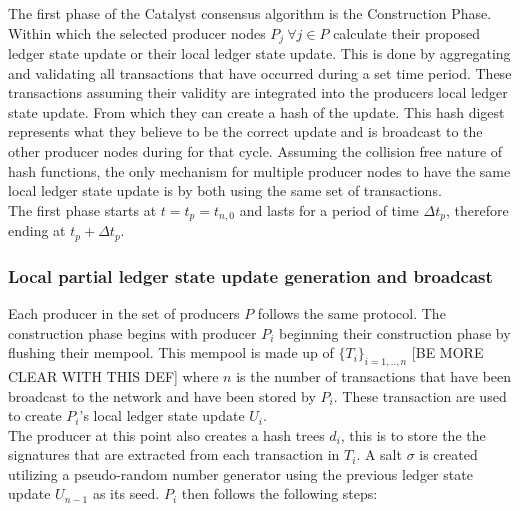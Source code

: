 \documentclass{article}
\begin{document}
The first phase of the Catalyst consensus algorithm is the Construction Phase. Within which the selected producer nodes  $P_j~\forall j \in P$ calculate their proposed ledger state update or their local ledger state update. This is done by aggregating and validating all transactions that have occurred during a set time period. These transactions assuming their validity are integrated into the producers local ledger state update. From which they can create a hash of the update. This hash digest represents what they believe to be the correct update and is broadcast to the other producer nodes during for that cycle. Assuming the collision free nature of hash functions, the only mechanism for multiple producer nodes to have the same local ledger state update is by both using the same set of transactions. \\

The first phase starts at $t = t_p = t_{n,0}$ and lasts for a period of time $\Delta t_{p}$, therefore ending at $t_p+\Delta t_{p}$.

\subsubsection{Local partial ledger state update generation and broadcast}

Each producer in the set of producers $P$ follows the same protocol. The construction phase begins with producer $P_i$ beginning their construction phase by flushing their mempool. This mempool is made up of $\{T_i\}_{i=1,..,n}$ [BE MORE CLEAR WITH THIS DEF] where $n$ is the number of transactions that have been broadcast to the network and have been stored by $P_i$. These transaction are used to create $P_i$'s local ledger state update $U_i$.  \\

The producer at this point also creates a hash trees $d_i$, this is to store the the signatures that are extracted from each transaction in $T_i$. A salt $\sigma$ is created utilizing a pseudo-random number generator using the previous ledger state update $U_{n-1}$ as its seed. $P_i$ then follows the following steps: 
\end{document}
